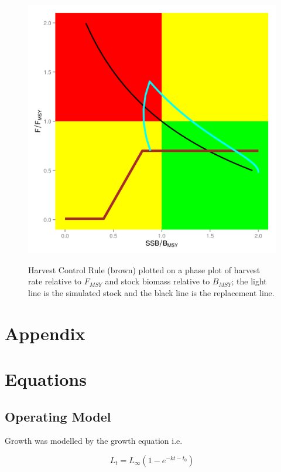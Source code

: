 \documentclass[%
nonumbib,      %
%
]{nrc1}                          %
\begin{document}
\begin{figure}[htbp]
\centering
\includegraphics[width=6in]{hcr.png}
\label{fig:hcr}
\caption{Harvest Control Rule (brown) plotted on a phase plot of harvest rate relative to $F_{MSY}$ and stock biomass relative to $B_{MSY}$; the light line is the simulated stock and the black line is the replacement line.}
\end{figure}

\newpage\clearpage
\section{Appendix}

\newpage\clearpage
\section*{Equations}

\subsection*{Operating Model}

Growth was modelled by the \cite{vonbert1957quantitative} growth equation i.e.
 
\begin{equation} L_t = L_{\infty}(1 - e^{-kt-t_0}) \end{equation} 
 
\end{document}
